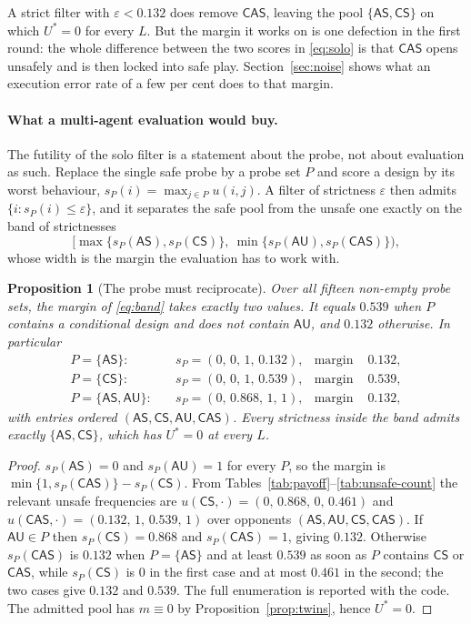 \documentclass[11pt,a4paper]{article}
\newtheorem{proposition}[theorem]{Proposition}
\theoremstyle{definition}
\newcommand{\AS}{\textsf{AS}}
\newcommand{\AU}{\textsf{AU}}
\newcommand{\CS}{\textsf{CS}}
\newcommand{\CAS}{\textsf{CAS}}
\begin{document}
A strict filter with $\varepsilon<0.132$ does remove $\CAS$, leaving the pool
$\{\AS,\CS\}$ on which $U^{*}=0$ for every $L$. But the margin it works on is
one defection in the first round: the whole difference between the two scores
in \eqref{eq:solo} is that $\CAS$ opens unsafely and is then locked into safe
play. Section~\ref{sec:noise} shows what an execution error rate of a few per
cent does to that margin.

\paragraph{What a multi-agent evaluation would buy.}
The futility of the solo filter is a statement about the probe, not about
evaluation as such. Replace the single safe probe by a probe set $P$ and score
a design by its worst behaviour, $s_{P}(i)=\max_{j\in P} u(i,j)$. A filter of
strictness $\varepsilon$ then admits $\{i:s_{P}(i)\le\varepsilon\}$, and it
separates the safe pool from the unsafe one exactly on the band of
strictnesses
\begin{equation}
\Big[\max\{s_{P}(\AS),s_{P}(\CS)\},\ \min\{s_{P}(\AU),s_{P}(\CAS)\}\Big),
\label{eq:band}
\end{equation}
whose width is the margin the evaluation has to work with.

\begin{proposition}[The probe must reciprocate]\label{prop:probe}
Over all fifteen non-empty probe sets, the margin of \eqref{eq:band} takes
exactly two values. It equals $0.539$ when $P$ contains a conditional design
and does not contain $\AU$, and $0.132$ otherwise. In particular
\begin{equation}
\begin{aligned}
P=\{\AS\}:&\quad s_{P}=(0,\,0,\,1,\,0.132), &\text{margin } &0.132,\\
P=\{\CS\}:&\quad s_{P}=(0,\,0,\,1,\,0.539), &\text{margin } &0.539,\\
P=\{\AS,\AU\}:&\quad s_{P}=(0,\,0.868,\,1,\,1), &\text{margin } &0.132,
\end{aligned}
\label{eq:probe}
\end{equation}
with entries ordered $(\AS,\CS,\AU,\CAS)$. Every strictness inside the band
admits exactly $\{\AS,\CS\}$, which has $U^{*}=0$ at every $L$.
\end{proposition}

\begin{proof}
$s_{P}(\AS)=0$ and $s_{P}(\AU)=1$ for every $P$, so the margin is
$\min\{1,s_{P}(\CAS)\}-s_{P}(\CS)$. From
Tables~\ref{tab:payoff}--\ref{tab:unsafe-count} the relevant unsafe
frequencies are $u(\CS,\cdot)=(0,\,0.868,\,0,\,0.461)$ and
$u(\CAS,\cdot)=(0.132,\,1,\,0.539,\,1)$ over opponents
$(\AS,\AU,\CS,\CAS)$. If $\AU\in P$ then $s_{P}(\CS)=0.868$ and
$s_{P}(\CAS)=1$, giving $0.132$. Otherwise $s_{P}(\CAS)$ is $0.132$ when
$P=\{\AS\}$ and at least $0.539$ as soon as $P$ contains $\CS$ or $\CAS$,
while $s_{P}(\CS)$ is $0$ in the first case and at most $0.461$ in the second;
the two cases give $0.132$ and $0.539$. The full enumeration is reported with
the code. The admitted pool has $m\equiv0$ by Proposition~\ref{prop:twins},
hence $U^{*}=0$.
\end{proof}
\end{document}
